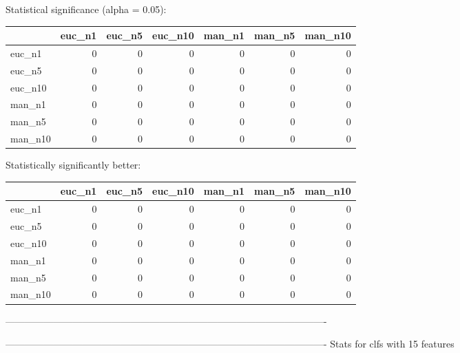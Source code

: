 Statistical significance (alpha = 0.05):
 \begin{tabular}{lrrrrrr}
\hline
         &   euc\_n1 &   euc\_n5 &   euc\_n10 &   man\_n1 &   man\_n5 &   man\_n10 \\
\hline
 euc\_n1  &        0 &        0 &         0 &        0 &        0 &         0 \\
 euc\_n5  &        0 &        0 &         0 &        0 &        0 &         0 \\
 euc\_n10 &        0 &        0 &         0 &        0 &        0 &         0 \\
 man\_n1  &        0 &        0 &         0 &        0 &        0 &         0 \\
 man\_n5  &        0 &        0 &         0 &        0 &        0 &         0 \\
 man\_n10 &        0 &        0 &         0 &        0 &        0 &         0 \\
\hline
\end{tabular} 

Statistically significantly better:
 \begin{tabular}{lrrrrrr}
\hline
         &   euc\_n1 &   euc\_n5 &   euc\_n10 &   man\_n1 &   man\_n5 &   man\_n10 \\
\hline
 euc\_n1  &        0 &        0 &         0 &        0 &        0 &         0 \\
 euc\_n5  &        0 &        0 &         0 &        0 &        0 &         0 \\
 euc\_n10 &        0 &        0 &         0 &        0 &        0 &         0 \\
 man\_n1  &        0 &        0 &         0 &        0 &        0 &         0 \\
 man\_n5  &        0 &        0 &         0 &        0 &        0 &         0 \\
 man\_n10 &        0 &        0 &         0 &        0 &        0 &         0 \\
\hline
\end{tabular} 

----------------------------------------------------------------------------------------------------



----------------------------------------------------------------------------------------------------
Stats for clfs with 15 features


